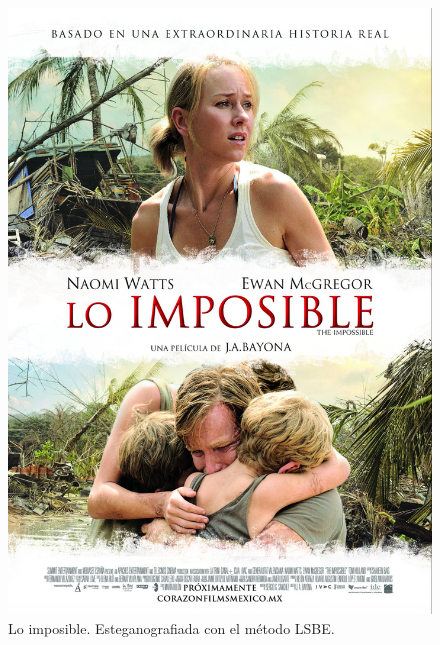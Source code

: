 \documentclass[a4paper,10pt]{article}
\begin{document}
\begin{figure}[!htb]
\endminipage
{}%
   \includegraphics[scale=0.5]{./images/loimposible.png}
  \caption{Lo imposible. Esteganografiada con el método LSBE.}\label{fig:awesome_image4}
\endminipage
\end{figure}

\clearpage
\end{document}
